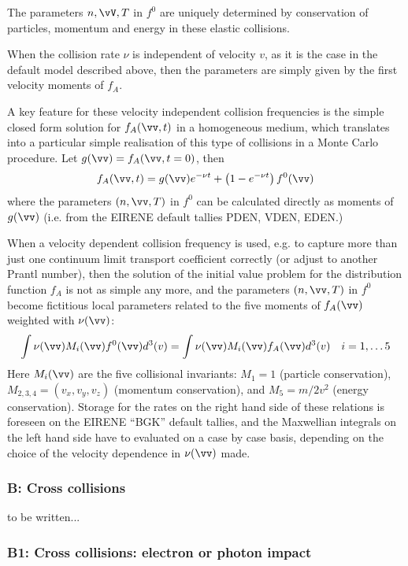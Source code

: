 The parameters $n, \vV, T$ in $f^0$ are uniquely determined by conservation of particles, momentum and
energy in these elastic collisions.

When the collision rate $\nu$ is independent of velocity $v$, as it is the case in the default model described
above, then the parameters are simply given by the first velocity moments of $f_A$.

A key feature for these velocity independent collision frequencies is the simple closed form solution for $f_A(\vv,t)$
in a homogeneous medium, which translates into a particular simple realisation of this type of collisions in a Monte Carlo
procedure. Let $g(\vv)=f_A(\vv,t=0)$, then
\begin{equation}
f_A(\vv,t)=g(\vv)e^{-\nu t} +\left(1-e^{-\nu t}\right) f^0(\vv)
\end{equation}
where the parameters $(n, \vv, T)$ in $f^0$ can be calculated directly as moments of $g(\vv)$
(i.e. from the EIRENE default tallies PDEN, VDEN, EDEN.)

When a velocity dependent collision frequency is used, e.g. to capture
more than just one continuum limit transport coefficient correctly (or adjust to another Prantl number), then the solution of the
initial value problem for the distribution function $f_A$ is not as simple any more, and the
parameters $(n, \vv, T)$ in $f^0$ become fictitious local parameters related to the five moments of $f_A(\vv)$
weighted with $\nu(\vv)$:
\begin{equation}
\int \nu(\vv) M_i(\vv) f^0(\vv) d^3(v) =  \int \nu(\vv) M_i(\vv) f_A(\vv) d^3(v) \ \ \ i=1,\dots 5
\end{equation}
Here $M_i(\vv)$ are the five collisional invariants: $M_1 = 1$ (particle conservation),
$M_{2,3,4} = (v_x,v_y,v_z)$ (momentum conservation), and $M_5 = m/2 v^2$ (energy conservation).
Storage for the rates on the right hand side of these relations is foreseen on the EIRENE ``BGK'' default tallies,
and the Maxwellian integrals on the left hand side have to evaluated on a case by case basis, depending on the
choice of the velocity dependence in $\nu(\vv)$ made.


\subsubsection{B: Cross collisions}

to be written...

\subsubsection{B1: Cross collisions: electron or photon impact}

